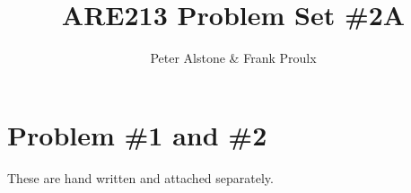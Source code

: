 \documentclass[letterpaper, 12pt]{article}
\begin{document}
\title{ARE213 Problem Set \#2A}
\author{Peter Alstone \& Frank Proulx}
\maketitle

\section{Problem \#1 and \#2}
These are hand written and attached separately.
%
%
%
%
%
%
%
%
%
\end{document}
